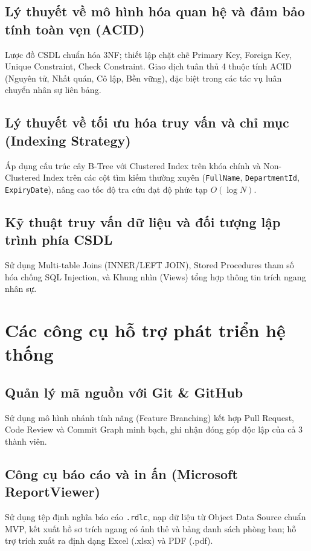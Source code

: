 \documentclass[12pt,a4paper]{report}
\begin{document}
\subsection{Lý thuyết về mô hình hóa quan hệ và đảm bảo tính toàn vẹn (ACID)}
Lược đồ CSDL chuẩn hóa 3NF; thiết lập chặt chẽ Primary Key, Foreign Key, Unique Constraint, Check Constraint. Giao dịch tuân thủ 4 thuộc tính ACID (Nguyên tử, Nhất quán, Cô lập, Bền vững), đặc biệt trong các tác vụ luân chuyển nhân sự liên bảng.

\subsection{Lý thuyết về tối ưu hóa truy vấn và chỉ mục (Indexing Strategy)}
Áp dụng cấu trúc cây B-Tree với Clustered Index trên khóa chính và Non-Clustered Index trên các cột tìm kiếm thường xuyên (\texttt{FullName}, \texttt{DepartmentId}, \texttt{ExpiryDate}), nâng cao tốc độ tra cứu đạt độ phức tạp $O(\log N)$.

\subsection{Kỹ thuật truy vấn dữ liệu và đối tượng lập trình phía CSDL}
Sử dụng Multi-table Joins (INNER/LEFT JOIN), Stored Procedures tham số hóa chống SQL Injection, và Khung nhìn (Views) tổng hợp thông tin trích ngang nhân sự.

\section{Các công cụ hỗ trợ phát triển hệ thống}

\subsection{Quản lý mã nguồn với Git \& GitHub}
Sử dụng mô hình nhánh tính năng (Feature Branching) kết hợp Pull Request, Code Review và Commit Graph minh bạch, ghi nhận đóng góp độc lập của cả 3 thành viên.

\subsection{Công cụ báo cáo và in ấn (Microsoft ReportViewer)}
Sử dụng tệp định nghĩa báo cáo \texttt{.rdlc}, nạp dữ liệu từ Object Data Source chuẩn MVP, kết xuất hồ sơ trích ngang có ảnh thẻ và bảng danh sách phòng ban; hỗ trợ trích xuất ra định dạng Excel (.xlsx) và PDF (.pdf).
\end{document}
